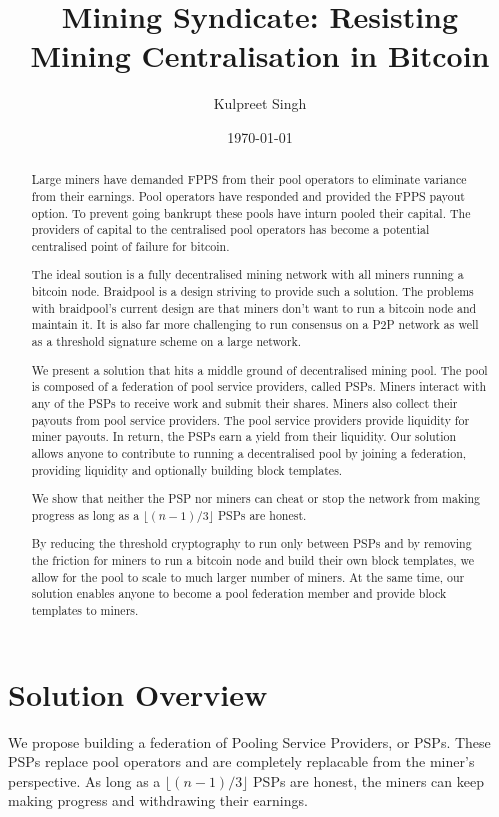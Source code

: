 \documentclass{article}
\title{Mining Syndicate: Resisting Mining Centralisation in Bitcoin}
\author{Kulpreet Singh}
\date{\today}
\begin{document}
\maketitle

\begin{abstract}
Large miners have demanded FPPS from their pool operators to eliminate
variance from their earnings. Pool operators have responded and
provided the FPPS payout option. To prevent going bankrupt these pools
have inturn pooled their capital. The providers of capital to the
centralised pool operators has become a potential centralised point of
failure for bitcoin.

The ideal soution is a fully decentralised mining network with all
miners running a bitcoin node. Braidpool is a design striving to
provide such a solution. The problems with braidpool's current design
are that miners don't want to run a bitcoin node and maintain it. It
is also far more challenging to run consensus on a P2P network as well
as a threshold signature scheme on a large network.

We present a solution that hits a middle ground of decentralised
mining pool. The pool is composed of a federation of pool service
providers, called PSPs. Miners interact with any of the PSPs to
receive work and submit their shares. Miners also collect their
payouts from pool service providers. The pool service providers
provide liquidity for miner payouts. In return, the PSPs earn a yield
from their liquidity. Our solution allows anyone to contribute to
running a decentralised pool by joining a federation, providing
liquidity and optionally building block templates.

We show that neither the PSP nor miners can cheat or stop the network
from making progress as long as a $\lfloor (n-1)/3 \rfloor$ PSPs are
honest.

By reducing the threshold cryptography to run only between PSPs and by
removing the friction for miners to run a bitcoin node and build their
own block templates, we allow for the pool to scale to much larger
number of miners. At the same time, our solution enables anyone to
become a pool federation member and provide block templates to miners.
\end{abstract}
   
\section{Solution Overview}

We propose building a federation of Pooling Service Providers, or
PSPs. These PSPs replace pool operators and are completely replacable
from the miner's perspective. As long as a $\lfloor (n-1)/3\rfloor$
PSPs are honest, the miners can keep making progress and withdrawing
their earnings.
\end{document}
